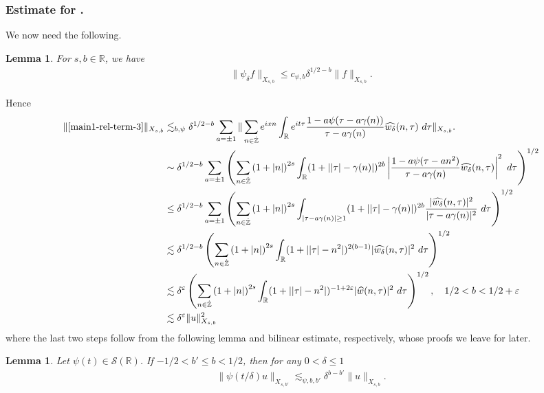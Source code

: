 \documentclass[12pt,reqno]{amsart}
\numberwithin{equation}{section}  %
\renewcommand{\cref}{\Cref}
\newcommand{\rr}{\mathbb{R}}
\newcommand{\zz}{\mathbb{Z}}
\newcommand{\zzdot}{\dot{\zz}}
\newcommand{\wh}{\widehat}
\newcommand{\ee}{\varepsilon}
\newtheorem{lemma}[theorem]{Lemma}
\begin{document}
\subsubsection{Estimate for \cref{main1-rel-term-3}.}
We now need the following.
\begin{lemma}
\label{lem:schwartz-mult}
For $s, b \in \rr$, we have
\begin{equation}
\label{schwartz-mult}
\begin{split}
\|\psi_{\delta} f \|_{X_{s,b}} \le c_{\psi, b} \delta^{1/2-b} \|f \|_{X_{s,b}}.
\end{split}
\end{equation}
\end{lemma}
Hence
\begin{equation}
\label{yu}
\begin{split}
\|\cref{main1-rel-term-3}\|_{X_{s,b}} 
& \lesssim_{b, \psi} \delta^{1/2 - b}
\sum_{a = \pm 1} \| \sum_{n \in \zzdot}  e^{ixn} \int_\rr 
e^{it \tau} \frac{1 - a\psi (\tau - a\gamma(n) ) 
}{\tau - a\gamma(n)} \wh{w_{\delta}}(n, \tau) \ 
d \tau\|_{X_{s,b}}.
\\
& \sim \delta^{1/2 - b}\sum_{a = \pm 1}\left( \sum_{n \in \zzdot} \left (1 + |n| \right )^{2s} \int_\rr
(1 + |  |\tau| - \gamma(n)|)^{2b} \left | \frac{1 - a\psi(\tau - an^{2 
})}{\tau - a\gamma(n)} 
\wh{w_{\delta}}(n, \tau) \right |^2 \ d 
\tau \right)^{1/2}
\\
& \le \delta^{1/2 -b}\sum_{a = \pm 1}
\left( \sum_{n \in \zzdot} \left (1 + |n| \right )^{2s} \int_{| \tau - a\gamma(n)| \ge 1}
(1 + | |\tau| - \gamma(n)|)^{2b} \frac{|  \wh{w_{\delta}}(n, \tau)|^2}{|\tau - a\gamma(n)|^2} 
\ d 
\tau \right)^{1/2}
\\
& \lesssim \delta^{1/2 -b}
\left( \sum_{n \in 
\zzdot} \left (1 + |n| \right )^{2s} \int_\rr (1 +  || \tau | - n^{2}|)^{2(b-1)} | \wh{w_{\delta}}(n, \tau) |^2 
\ d \tau 
\right)^{1/2}
\\
& \lesssim \delta^{\ee}
\left( \sum_{n \in 
\zzdot} \left (1 + |n| \right )^{2s} \int_\rr (1 +  || \tau | - n^{2}|)^{-1+ 2\ee} | \wh{w}(n, \tau) |^2 
\ d \tau 
\right)^{1/2}, \quad 1/2 < b < 1/2 + \ee
\\
& \lesssim \delta^{\ee} \| u \|_{X_{s,b}}^{2}
\end{split}
\end{equation}
where the last two steps follow from the following lemma and bilinear estimate, respectively, whose proofs we leave for later.
\begin{lemma}
Let $\psi(t) \in \mathcal{S}(\rr)$. If $-1/2 < b' \le b < 1/2$, then for any
$0 < \delta \le 1$
\begin{equation*}
\begin{split}
\| \psi(t/\delta) u \|_{X_{s,b'}} \lesssim_{\psi, b, b'} \delta^{b - b'} \| u
\|_{X_{s,b}}.
\end{split}
\end{equation*}
\label{lem:time-local-est}
\end{lemma}
\end{document}
